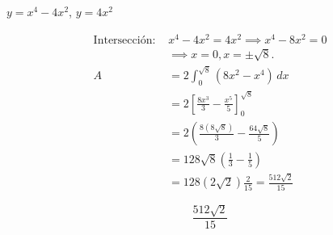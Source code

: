 $y=x^4-4x^2$, $y=4x^2$

\nopagebreak
\begin{align*}
\text{Intersección: } & x^4-4x^2 = 4x^2 \implies x^4-8x^2=0 \\
& \implies x=0, x=\pm\sqrt{8}. \\
A &= 2 \int_{0}^{\sqrt{8}} (8x^2 - x^4) \, dx \\
&= 2 \left[ \frac{8x^3}{3} - \frac{x^5}{5} \right]_{0}^{\sqrt{8}} \\
&= 2 \left( \frac{8(8\sqrt{8})}{3} - \frac{64\sqrt{8}}{5} \right) \\
&= 128\sqrt{8} \left( \frac{1}{3} - \frac{1}{5} \right) \\
&= 128(2\sqrt{2}) \frac{2}{15} = \frac{512\sqrt{2}}{15}
\end{align*}

\[
\boxed{\displaystyle \frac{512\sqrt{2}}{15}}
\]
